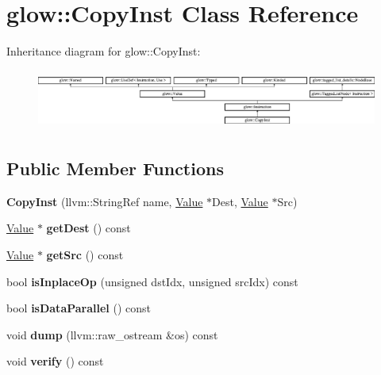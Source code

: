\hypertarget{classglow_1_1_copy_inst}{}\section{glow\+:\+:Copy\+Inst Class Reference}
\label{classglow_1_1_copy_inst}
Inheritance diagram for glow\+:\+:Copy\+Inst\+:\begin{figure}[H]
\begin{center}
\leavevmode
\includegraphics[height=1.991111cm]{classglow_1_1_copy_inst}
\end{center}
\end{figure}
\subsection*{Public Member Functions}
\begin{DoxyCompactItemize}
\item 
\mbox{\label{classglow_1_1_copy_inst_a2be474aa9ce67b02712ed3fe5710a41e}} 
{\bfseries Copy\+Inst} (llvm\+::\+String\+Ref name, \hyperlink{classglow_1_1_value}{Value} $\ast$Dest, \hyperlink{classglow_1_1_value}{Value} $\ast$Src)
\item 
\mbox{\label{classglow_1_1_copy_inst_a438f4e765990a111cdc9e1b090cfa52c}} 
\hyperlink{classglow_1_1_value}{Value} $\ast$ {\bfseries get\+Dest} () const
\item 
\mbox{\label{classglow_1_1_copy_inst_a00e6637a37cbebf8614ff21b488fa42a}} 
\hyperlink{classglow_1_1_value}{Value} $\ast$ {\bfseries get\+Src} () const
\item 
\mbox{\label{classglow_1_1_copy_inst_abdfab5acaa493ed13b3c2247c1c462d7}} 
bool {\bfseries is\+Inplace\+Op} (unsigned dst\+Idx, unsigned src\+Idx) const
\item 
\mbox{\label{classglow_1_1_copy_inst_af57b7a83151d0e2072f572fd1e4f2d4b}} 
bool {\bfseries is\+Data\+Parallel} () const
\item 
\mbox{\label{classglow_1_1_copy_inst_aebd707971bb1761055f35c5ff941bfe3}} 
void {\bfseries dump} (llvm\+::raw\+\_\+ostream \&os) const
\item 
\mbox{\label{classglow_1_1_copy_inst_ae52c390fee9bf09265a420e2ad8a5e29}} 
void {\bfseries verify} () const
\end{DoxyCompactItemize}
